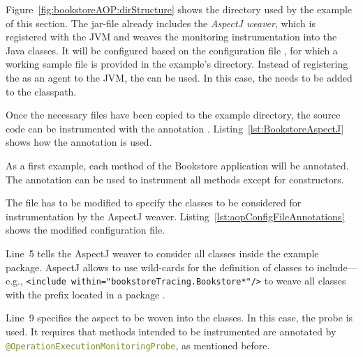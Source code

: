 Figure~\ref{fig:bookstoreAOP:dirStructure} shows the directory used by the example of this section. %
The jar-file \file{\mainJarWeaver} already includes the \textit{AspectJ weaver}, %
which is registered with the JVM and weaves the monitoring instrumentation into %
the Java classes. It will be configured based on the configuration file %
\file{\file{\aopConfigFile}}, for which a working sample file is provided in the %
example's  directory. Instead of registering the \file{\mainJarWeaver} %
as an agent to the JVM, the \file{\aspectJWeaverJar} can be used. In this case, %
the \file{\mainJar} needs to be added to the classpath.

Once the necessary files have been copied to the example directory, the source code can be instrumented with the annotation
. Listing~\ref{lst:BookstoreAspectJ} shows how the annotation is used.

\setJavaCodeListing


\noindent As a first example, each method of the Bookstore application will be annotated. The annotation can be used to instrument all methods except for constructors.

The \file{\aopConfigFile} file has to be modified to specify the classes to be considered for instrumentation by the AspectJ weaver. Listing~\ref{lst:aopConfigFileAnnotations} shows the modified configuration file.

\enlargethispage{1cm}
\setXMLListing


\noindent Line~5 tells the AspectJ weaver to consider all classes inside the example package. %
AspectJ allows to use wild-cards for the definition of classes to %
include---e.g., \lstinline$<include within="bookstoreTracing.Bookstore*"/>$ to weave all %
classes with the prefix  located in a package .

Line~9 specifies the aspect to be woven into the classes. In this case, the \Kieker{} %
probe  is used. It requires that %
methods intended to be instrumented are annotated by %
\lstinline[language=Java]{@OperationExecutionMonitoringProbe}, as mentioned before.

